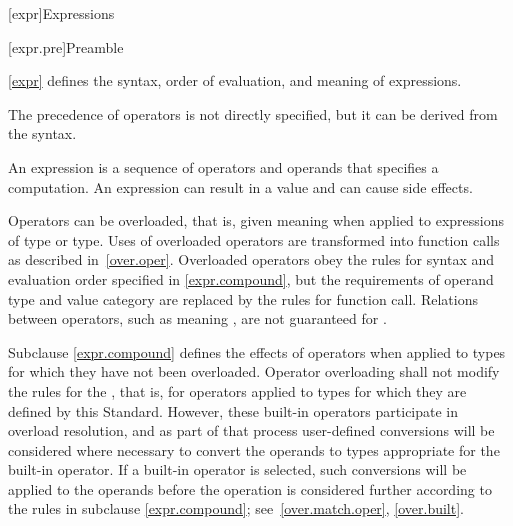 [expr]{Expressions}


%
%
%
%
%
%
%

[expr.pre]{Preamble}

\pnum
{}%
\begin{note}
\ref{expr} defines the syntax, order of evaluation, and meaning
of expressions.
\begin{footnote}
The precedence of operators is not directly specified, but it can be
derived from the syntax.
\end{footnote}
An expression is a sequence of operators and operands that specifies a
computation. An expression can result in a value and can cause side
effects.
\end{note}

\pnum
{}%
\begin{note}
Operators can be overloaded, that is, given meaning when applied to
expressions of  type or
 type. Uses of overloaded operators are transformed into
function calls as described in~\ref{over.oper}. Overloaded operators
obey the rules for syntax and evaluation order specified in \ref{expr.compound},
but the requirements of operand type and value category are replaced
by the rules for function call. Relations between operators, such as
 meaning , are not guaranteed for .
\end{note}

\pnum
Subclause \ref{expr.compound} defines the effects of operators when applied to types
for which they have not been overloaded. Operator overloading shall not
modify the rules for the ,
that is, for operators applied to types for which they are defined by this
Standard. However, these built-in operators participate in overload
resolution, and as part of that process user-defined conversions will be
considered where necessary to convert the operands to types appropriate
for the built-in operator. If a built-in operator is selected, such
conversions will be applied to the operands before the operation is
considered further according to the rules in subclause \ref{expr.compound};
see~\ref{over.match.oper}, \ref{over.built}.

